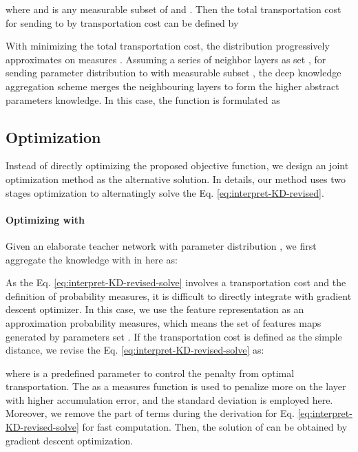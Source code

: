 \documentclass[10pt,twocolumn,letterpaper]{article}
\begin{document}
where  and  is any measurable subset of  and .
Then the total transportation cost for sending  to 
by transportation cost 
can be defined by



With minimizing the total transportation cost,
the distribution  progressively approximates  on measures .
Assuming a series of neighbor layers  as set ,
for sending parameter distribution  to 
with measurable subset ,
the deep knowledge aggregation scheme merges the neighbouring layers
to form the higher abstract parameters knowledge.
In this case,
the function  is formulated as





\subsection{Optimization} \label{3dot4}
Instead of directly optimizing the proposed objective function,
we design an joint optimization method as the alternative solution.
In details, our method uses two stages optimization
to alternatingly solve the Eq. \ref{eq:interpret-KD-revised}.

\paragraph{Optimizing  with }
Given an elaborate teacher network with parameter distribution ,
we first aggregate the knowledge  with  in here
as:



As the Eq. \ref{eq:interpret-KD-revised-solve} involves a transportation cost
and the definition of probability measures,
it is difficult to directly integrate with gradient descent optimizer.
In this case,
we use the feature representation  as an approximation probability measures,
which means the set of features maps  generated by parameters set .
If the transportation cost  is defined as the simple  distance,
we revise the Eq. \ref{eq:interpret-KD-revised-solve} as:



where  is a predefined parameter to control the penalty from optimal transportation.
The  as a measures function is used to
penalize more on the layer with higher accumulation error,
and the standard deviation is employed here.
Moreover, we remove the part of terms during the derivation
for Eq. \ref{eq:interpret-KD-revised-solve} for fast computation.
Then, the solution of  can be obtained by gradient descent optimization.
\end{document}
